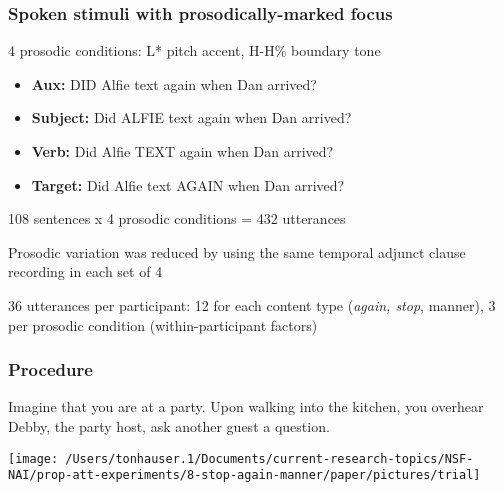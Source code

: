 \documentclass[pdf,xcolor=table,envcountsect,handout]{beamer}
\begin{document}
\begin{frame}
\frametitle{Spoken stimuli with prosodically-marked focus}

4 prosodic conditions: L* pitch accent, H-H\% boundary tone

\pause

\begin{itemize}[leftmargin=2ex]
\item[] {\bf Aux:}  DID Alfie text again when Dan arrived? \hfill {} 

\item[] {\bf Subject:} Did ALFIE text again when Dan arrived? \hfill {}

\item[] {\bf Verb:} Did Alfie TEXT again when Dan arrived? \hfill {}

\item[] {\bf Target:} Did Alfie text AGAIN when Dan arrived? \hfill {}

\end{itemize}

\medskip
\pause

108 sentences x 4 prosodic conditions = 432 utterances

\medskip
\pause

Prosodic variation was reduced by using the same temporal adjunct clause recording in each set of 4

\medskip
\pause

36 utterances per participant: 12 for each content type ({\em again, stop}, manner), 3 per prosodic condition (within-participant factors)

\end{frame}

\begin{frame}
\frametitle{Procedure}

Imagine that you are at a party. Upon walking into the kitchen, you overhear Debby, the party host, ask another guest a question.


\vspace*{1cm}

\texttt{[image: /Users/tonhauser.1/Documents/current-research-topics/NSF-NAI/prop-att-experiments/8-stop-again-manner/paper/pictures/trial]}  

\end{frame}
\end{document}
